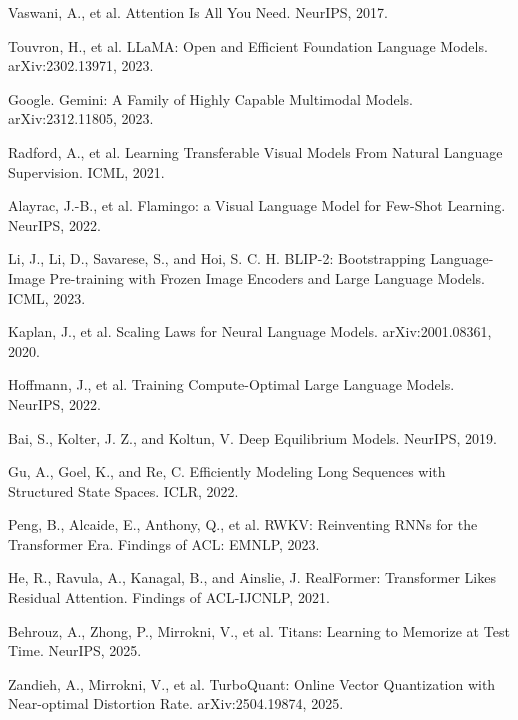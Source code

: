 \documentclass[12pt,a4paper]{article}
\begin{document}
\begin{enumerate}[label={[\arabic*]}, resume]
    \item Vaswani, A., et al. Attention Is All You Need. NeurIPS, 2017.

    \item Touvron, H., et al. LLaMA: Open and Efficient Foundation Language Models. arXiv:2302.13971, 2023.

    \item Google. Gemini: A Family of Highly Capable Multimodal Models. arXiv:2312.11805, 2023.

    \item Radford, A., et al. Learning Transferable Visual Models From Natural Language Supervision. ICML, 2021.

    \item Alayrac, J.-B., et al. Flamingo: a Visual Language Model for Few-Shot Learning. NeurIPS, 2022.

    \item Li, J., Li, D., Savarese, S., and Hoi, S. C. H. BLIP-2: Bootstrapping Language-Image Pre-training with Frozen Image Encoders and Large Language Models. ICML, 2023.

    \item Kaplan, J., et al. Scaling Laws for Neural Language Models. arXiv:2001.08361, 2020.

    \item Hoffmann, J., et al. Training Compute-Optimal Large Language Models. NeurIPS, 2022.

    \item Bai, S., Kolter, J. Z., and Koltun, V. Deep Equilibrium Models. NeurIPS, 2019.

    \item Gu, A., Goel, K., and Re, C. Efficiently Modeling Long Sequences with Structured State Spaces. ICLR, 2022.

    \item Peng, B., Alcaide, E., Anthony, Q., et al. RWKV: Reinventing RNNs for the Transformer Era. Findings of ACL: EMNLP, 2023.

    \item He, R., Ravula, A., Kanagal, B., and Ainslie, J. RealFormer: Transformer Likes Residual Attention. Findings of ACL-IJCNLP, 2021.

    \item Behrouz, A., Zhong, P., Mirrokni, V., et al. Titans: Learning to Memorize at Test Time. NeurIPS, 2025.

    \item Zandieh, A., Mirrokni, V., et al. TurboQuant: Online Vector Quantization with Near-optimal Distortion Rate. arXiv:2504.19874, 2025.


\end{enumerate}
\end{document}
